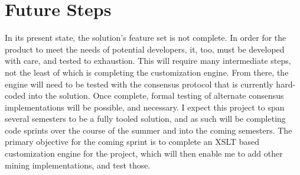 \documentclass[11pt]{article}
\begin{document}
    \section{Future Steps}
    In its present state, the solution's feature set is not complete.
    In order for the product to meet the needs of potential developers, it, too, must be developed with care, and tested
    to exhaustion.
    This will require many intermediate steps, not the least of which is completing the customization engine.
    From there, the engine will need to be tested with the consensus protocol that is currently hard-coded into the
    solution.
    Once complete, formal testing of alternate consensus implementations will be possible, and necessary.
    I expect this project to span several semesters to be a fully tooled solution, and as such will be completing code
    sprints over the course of the summer and into the coming semesters.
    The primary objective for the coming sprint is to complete an XSLT based customization engine for the project, which
    will then enable me to add other mining implementations, and test those.
\end{document}

